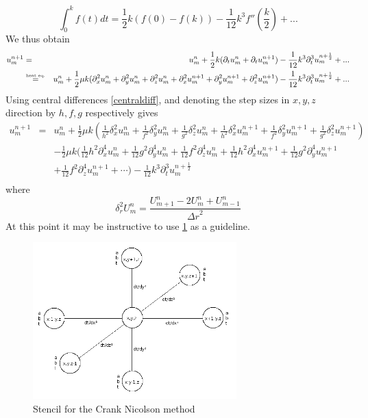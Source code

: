 \begin{equation}
\int_0^k f(t) dt = \frac{1}{2} k (f(0) - f(k)) -\frac{1}{12} k^3 f''(\frac{k}{2}) + ...
\label{trapezoidalrule}
\end{equation}
We thus obtain
\begin{eqnarray}
\label{res}
u_m^ {n+1} &=& u_m^ n + \frac{1}{2} k(\partial_t u_m^n + \partial_t u_m^{n+1}) - \frac{1}{12} k^3 \partial_t ^3 u_m^{n+\frac{1}{2}} + ...\\
&\stackrel{\text{\tiny heat eq.}}{=}& u_m^ n + \frac{1}{2} \mu k(\partial_x^2 u_m^n + \partial_y^2 u_m^n + \partial_z^2 u_m^n + \partial_x^2 u_m^{n+1} + \partial_y^2 u_m^{n+1} + \partial_z^2 u_m^{n+1}) - \frac{1}{12} k^3 \partial_t ^3    u_m^{n+\frac{1}{2}} + ... \nonumber
\end{eqnarray}
Using central differences \cref{centraldiff}, and denoting the step sizes in $x, y, z$ direction by $h, f, g$ respectively gives
\begin{eqnarray*}
u_m^{n+1} &=& u_m^ n + \frac{1}{2} \mu k(\frac{1}{h^2}\delta_x^2 u_m^n + \frac{1}{f^2}\delta_y^2 u_m^n + \frac{1}{g^2}\delta_z^2 u_m^n + \frac{1}{h^2}\delta_x^2 u_m^{n+1} + \frac{1}{f^2}\delta_y^2 u_m^{n+1} + \frac{1}{g^2}\delta_z^2 u_m^{n+1}) \\
  &&- \frac{1}{2} \mu k (\frac{1}{12}h^2\partial_x^4 u_m^n +
  \frac{1}{12}g^2\partial_y^4 u_m^n + \frac{1}{12}f^2\partial_z^4 u_m^n +
  \frac{1}{12}h^2\partial_x^4 u_m^{n+1} + \frac{1}{12}g^2\partial_y^4
  u_m^{n+1}\\
  &&+ \frac{1}{12}f^2\partial_z^4 u_m^{n+1} + \cdots)
  - \frac{1}{12} k^3 \partial_t ^3 u_m^{n+\frac{1}{2}} \\ 
\end{eqnarray*}
where
\begin{equation}
\delta_{r}^{2}U_m^{n}=\frac{U_{m+1}^{n}-2U_m^{n}+U_{m-1}^{n}}{{\Delta r}^{2}}
\label{centraldiff}
\end{equation}
At this point it may be instructive to use \cref{fig:stencil-numerics} as a guideline.

\begin{figure}[h!]
  \begin{center}
    \includegraphics[width=0.7\textwidth]{stencil.png}
  \end{center}
  \caption{Stencil for the Crank Nicolson method}
  \label{fig:stencil-numerics}
\end{figure}

